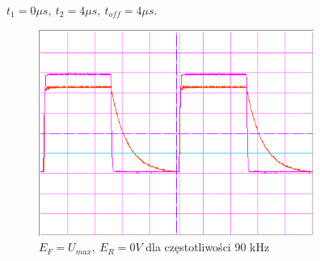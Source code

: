 \documentclass[a4paper,11pt]{article}
\begin{document}
\(t_1 = 0 \mu s,\ t_2 = 4 \mu s,\ t_{off} = 4 \mu s \).

\begin{figure} [H]
  \begin{center}
    \includegraphics[width = 9cm]{../Obrazki_i_tekst/obrobione/32sciety.png}
    \caption{\( E_F = U_{max}, \ E_R = 0V \) dla częstotliwości 90 kHz }
  \end{center}
\end{figure}
\end{document}
